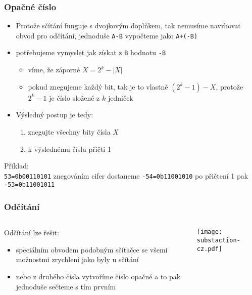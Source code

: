 \documentclass{beamer}
\begin{document}
\begin{frame}
\frametitle{Opačné číslo}
\begin{itemize}
\item Protože sčítání funguje s dvojkovým doplňkem, tak nemusíme navrhovat obvod pro odčítání, jednoduše \texttt{A-B} vypočteme jako \texttt{A+(-B)}
\item potřebujeme vymyslet jak získat z \texttt{B} hodnotu \texttt{-B}
\begin{itemize}
\item víme, že záporné $X = 2^k-|X|$
\item pokud znegujeme každý bit, tak je to vlastně $(2^{k}-1)-X$, protože $2^{k}-1$ je číslo složené z $k$ jedniček
\end{itemize}
\item Výsledný postup je tedy:
\begin{enumerate}
\item znegujte všechny bity čísla $X$
\item k výslednému číslu přičti 1
\end{enumerate}
\end{itemize}

Příklad:\\
\texttt{53=0b00110101} znegováním cifer dostaneme \texttt{-54=0b11001010} po přičtení 1 pak  \texttt{-53=0b11001011}

\end{frame}


\begin{frame}
\frametitle{Odčítání}


\begin{columns}
\begin{column}{0.5\textwidth}
Odčítání lze řešit:
\begin{itemize}
\item speciálním obvodem podobným sčítačce se všemi možnostmi zrychlení jako byly u sčítání
\item nebo z druhého čísla vytvoříme číslo opačné a to pak jednoduše sečteme s tím prvním
\end{itemize}
\end{column}
\hfill
\begin{column}{0.5\textwidth}
\begin{center}
\texttt{[image: substaction-cz.pdf]}
\end{center}
\end{column}
\end{columns}


\end{frame}
\end{document}
